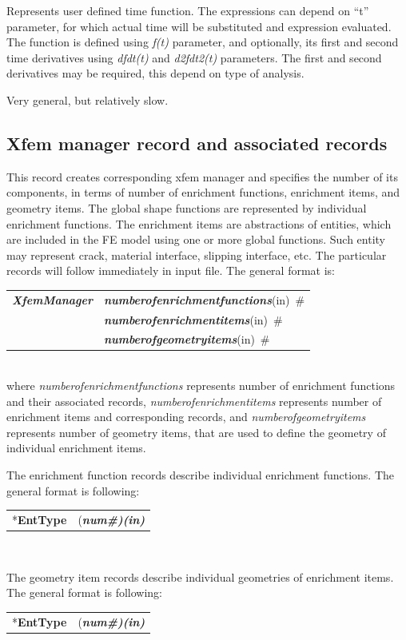 \documentclass[a4paper]{article}
\makeatletter
\newcommand{\param}[1]{{\em #1}}
\newcommand{\fieldVal}[2]{\mbox{({\it\bf{#1}\#)\tiny (#2)}}}
\newcommand{\keywordnotype}[1]{\mbox{{\it{\bf{#1}}}}}
\newcommand{\keyword}[2]{\mbox{{\keywordnotype{#1}\tiny (#2)}}}
\newcommand{\entKeyword}[1]{\mbox{{*{\bf{#1}}}}}
\newcommand{\field}[2]{\mbox{\keyword{#1}{#2}~\#}}
\newenvironment{record}[1][]{\begin{tabular}{|ll}}{\end{tabular}\\}
\newcommand{\recentry}[2]{{#1}&{#2}\\}
\newcounter{rcc}
\newenvironment{record}[1][\textwidth]{\setcounter{rcc}{0}\begin{tabular*}{#1}{|ll@{\extracolsep{\fill}}r}}{\end{tabular*}\\}
\newcommand{\recentry}[2]{\ifthenelse{\value{rcc}>0}{&$\backslash$ \\}{\setcounter{rcc}{1}}{#1}&{#2}}
\makeatother
\begin{document}
\begin{itemize}
  Represents user defined time function. The expressions can depend on
  ``t'' parameter, for which actual time will be substituted and
expression evaluated. The function is defined using \param{f(t)}
  parameter, and optionally, its first and second time derivatives
  using \param{dfdt(t)} and \param{d2fdt2(t)} parameters.
The first and second derivatives may be required, this depend on type
  of analysis.

Very general, but relatively slow.
\end{itemize}

\subsection{Xfem manager record and associated records}
\label{_XFEMManagerRecords}
This record creates corresponding xfem manager and specifies the number of its components, in terms of number of enrichment functions, enrichment items, and geometry items. The global shape functions are represented by  individual enrichment functions. The enrichment items are abstractions of entities, which are included in the FE model using one or more global functions. Such entity may represent crack, material interface, slipping interface, etc. The particular records will follow immediately in input file. The general format is:\\
\begin{record}
\recentry{\keywordnotype{XfemManager}}{\field{numberofenrichmentfunctions}{in}}
\recentry{}{\field{numberofenrichmentitems}{in}}
\recentry{}{\field{numberofgeometryitems}{in}}
\end{record}
where \param{numberofenrichmentfunctions} represents number of enrichment functions and their associated records, \param{numberofenrichmentitems}
represents number of enrichment items and corresponding records, and \param{numberofgeometryitems} represents number of geometry items, that are used to define the geometry of individual enrichment items.

The enrichment function records describe individual enrichment functions. The general format is following:\\
\noindent
\begin{record}
  \recentry{\entKeyword{EntType}}{\fieldVal{num}{in}}
\end{record}

The geometry item records describe individual geometries of enrichment items. The general format is following:\\
\noindent
\begin{record}
  \recentry{\entKeyword{EntType}}{\fieldVal{num}{in}}
\end{record}
\end{document}
